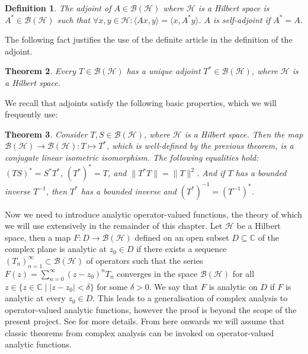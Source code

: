 \documentclass[12pt,oneside]{report}
\newtheorem{thm}{Theorem}[chapter]
\newtheorem{defn}[thm]{Definition}
\begin{document}
\begin{defn}
    The adjoint of $A \in \mathscr{B}(\mathscr{H})$ where $\mathscr{H}$ is a Hilbert space is $A^{*} \in \mathscr{B}(\mathscr{H})$ such that $\forall x,y \in \mathscr{H}: \langle Ax,y\rangle = \langle x, A^{*}y \rangle$. $A$ is self-adjoint if $A^{*} = A$.
\end{defn}

The following fact justifies the use of the definite article in the definition of the adjoint.

\begin{thm}
    Every $T \in \mathscr{B}(\mathscr{H})$ has a unique adjoint $T^{*} \in \mathscr{B}(\mathscr{H})$, where $\mathscr{H}$ is a Hilbert space.
\end{thm}

We recall that adjoints satisfy the following basic properties, which we will frequently use:

\begin{thm}\label{adjoint-basic-properties}
    Consider $T, S \in \mathscr{B}(\mathscr{H})$, where $\mathscr{H}$ is a Hilbert space. Then the map $\mathscr{B}(\mathscr{H}) \to \mathscr{B}(\mathscr{H}): T \mapsto T^{*}$, which is well-defined by the previous theorem, is a conjugate linear isometric isomorphism. The following equalities hold: $(TS)^{*} = S^{*}T^{*}$, $(T^{*})^{*} = T$, and $\|T^{*}T\| = \|T\|^{2}$. And if $T$ has a bounded inverse $T^{-1}$, then $T^{*}$ has a bounded inverse and $(T^{*})^{-1} = (T^{-1})^{*}$.
\end{thm}

Now we need to introduce analytic operator-valued functions, the theory of which we will use extensively in the remainder of this chapter. Let $\mathscr{H}$ be a Hilbert space, then a map $F: D \to \mathscr{B}(\mathscr{H})$ defined on an open subset $D \subseteq \mathbb{C}$ of the complex plane is analytic at $z_{0} \in D$ if there exists a sequence $(T_{n})_{n=1}^{\infty} \subset \mathscr{B}(\mathscr{H})$ of operators such that the series $F(z) = \sum_{n=0}^{\infty} (z - z_{0})^{n}T_{n}$ converges in the space $\mathscr{B}(\mathscr{H})$ for all $z \in \{ z \in \mathbb{C} \; | \; |z - z_{0}| < \delta \}$ for some $\delta > 0$. We say that $F$ is analytic on $D$ if $F$ is analytic at every $z_{0} \in D$. This leads to a generalisation of complex analysis to operator-valued analytic functions, however the proof is beyond the scope of the present project. See \cite{Hille_Phillips_1957} for more details. From here onwards we will assume that classic theorems from complex analysis can be invoked on operator-valued analytic functions.
\end{document}
